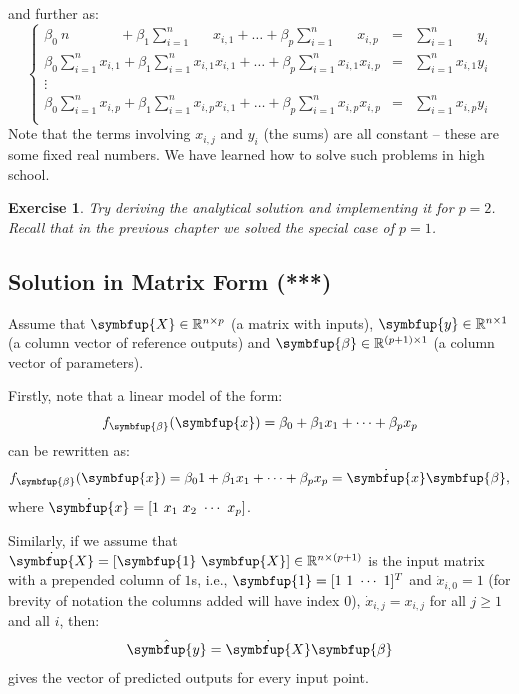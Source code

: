 \documentclass[10pt,b5paper,krantz1]{krantz}
\newtheorem{exercise}{Exercise}[chapter]
\renewcommand{\mathbf}[1]{\symbfup{#1}}
\renewcommand{\boldsymbol}[1]{\symbfup{#1}}
\begin{document}
and further as:
\[
\left\{
\begin{array}{rcl}
\beta_0\ n\phantom{\sum_{i=1}^n x} + \beta_1\sum_{i=1}^n \phantom{x_{i,0}}  x_{i,1}+\dots+\beta_p \sum_{i=1}^n \phantom{x_{i,0}}  x_{i,p} &=&\sum_{i=1}^n\phantom{x_{i,0}} y_i \\
\beta_0 \sum_{i=1}^n x_{i,1} + \beta_1\sum_{i=1}^n x_{i,1}  x_{i,1}+\dots+\beta_p \sum_{i=1}^n x_{i,1}  x_{i,p} &=&\sum_{i=1}^n x_{i,1} y_i \\
\vdots\\
\beta_0 \sum_{i=1}^n x_{i,p} + \beta_1\sum_{i=1}^n x_{i,p}  x_{i,1}+\dots+\beta_p \sum_{i=1}^n x_{i,p}  x_{i,p} &=&\sum_{i=1}^n x_{i,p} y_i \\
\end{array}
\right.
\]
Note that the terms involving \(x_{i,j}\) and \(y_i\) (the sums) are all constant
-- these are some fixed real numbers. We have learned how to solve such
problems in high school.

\begin{exercise}

Try deriving the analytical solution and implementing it for \(p=2\).
Recall that in the previous chapter we solved the special case of \(p=1\).

\end{exercise}

\hypertarget{solution-in-matrix-form}{%
\subsection{Solution in Matrix Form (***)}\label{solution-in-matrix-form}}

Assume that \(\mathbf{X}\in\mathbb{R}^{n\times p}\) (a matrix with inputs),
\(\mathbf{y}\in\mathbb{R}^{n\times 1}\) (a column vector of reference outputs)
and
\(\boldsymbol{\beta}\in\mathbb{R}^{(p+1)\times 1}\) (a column vector of parameters).

Firstly, note that a linear model of the form:
\[
f_{\boldsymbol\beta}(\mathbf{x})=\beta_0+\beta_1 x_1+\dots+\beta_p x_p
\]
can be rewritten as:
\[
f_{\boldsymbol\beta}(\mathbf{x})=\beta_0 1+\beta_1 x_1+\dots+\beta_p x_p
=\dot{\mathbf{x}}\boldsymbol\beta,
\]
where \(\dot{\mathbf{x}}=[1\ x_1\ x_2\ \cdots\ x_p]\).

Similarly, if we assume that \(\dot{\mathbf{X}}=[\boldsymbol{1}\ \mathbf{X}]\in\mathbb{R}^{n\times (p+1)}\)
is the input matrix with a prepended column of \(1\)s, i.e.,
\(\boldsymbol{1}=[1\ 1\ \cdots\ 1]^T\) and \(\dot{x}_{i,0}=1\) (for brevity of notation
the columns added will have index \(0\)),
\(\dot{x}_{i,j}=x_{i,j}\) for all \(j\ge 1\) and all \(i\),
then:
\[
\hat{\mathbf{y}} = \dot{\mathbf{X}} \boldsymbol\beta
\]
gives the vector of predicted outputs for every input point.
\end{document}
